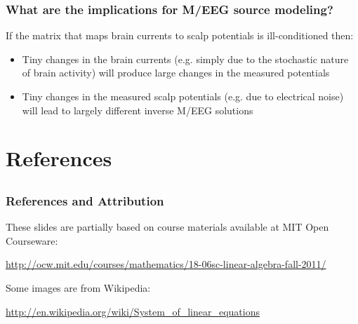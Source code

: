 \documentclass[compress]{beamer}
\newcommand{\black}[1]{{\color{black}#1}}
\begin{document}
\begin{frame}[fragile]
\frametitle{What are the implications for M/EEG source modeling?}

If the matrix that maps brain currents to scalp potentials is ill-conditioned then:

\vspace{.4cm}

\begin{itemize}

\item \black{Tiny changes in the brain currents (e.g. simply due to the stochastic nature of brain activity) will produce large changes in the measured potentials}

\vspace{.2cm}

\item \black{Tiny changes in the measured scalp potentials (e.g. due to electrical noise) will lead to largely different inverse M/EEG solutions}

\end{itemize}

\end{frame}






\section{References}
\subsection*{}

\begin{frame}
\frametitle{References and Attribution}

\small

These slides are partially based on course materials available at MIT Open Courseware:

\vspace{.5cm}
\black{\url{http://ocw.mit.edu/courses/mathematics/18-06sc-linear-algebra-fall-2011/}}


\vspace{1cm}

Some images are from Wikipedia:

\vspace{.5cm}
\black{\url{http://en.wikipedia.org/wiki/System_of_linear_equations}}


\end{frame}
\end{document}
